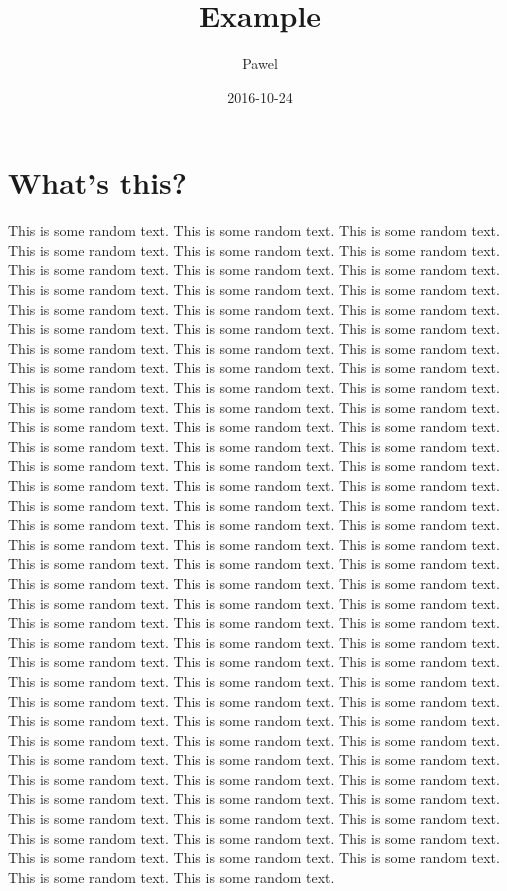 \documentclass[a4paper,35pt]{article}
\begin{document}
\title{Example}
\author{Pawel}
\date{2016-10-24}
\maketitle

\section{What's this?}
This is some random text.
This is some random text.
This is some random text.
This is some random text.
This is some random text.
This is some random text.
This is some random text.
This is some random text.
This is some random text.
This is some random text.
This is some random text.
This is some random text.
This is some random text.
This is some random text.
This is some random text.
This is some random text.
This is some random text.
This is some random text.
This is some random text.
This is some random text.
This is some random text.
This is some random text.
This is some random text.
This is some random text.
This is some random text.
This is some random text.
This is some random text.
This is some random text.
This is some random text.
This is some random text.
This is some random text.
This is some random text.
This is some random text.
This is some random text.
This is some random text.
This is some random text.
This is some random text.
This is some random text.
This is some random text.
This is some random text.
This is some random text.
This is some random text.
This is some random text.
This is some random text.
This is some random text.
This is some random text.
This is some random text.
This is some random text.
This is some random text.
This is some random text.
This is some random text.
This is some random text.
This is some random text.
This is some random text.
This is some random text.
This is some random text.
This is some random text.
This is some random text.
This is some random text.
This is some random text.
This is some random text.
This is some random text.
This is some random text.
This is some random text.
This is some random text.
This is some random text.
This is some random text.
This is some random text.
This is some random text.
This is some random text.
This is some random text.
This is some random text.
This is some random text.
This is some random text.
This is some random text.
This is some random text.
This is some random text.
This is some random text.
This is some random text.
This is some random text.
This is some random text.
This is some random text.
This is some random text.
This is some random text.
This is some random text.
This is some random text.
This is some random text.
This is some random text.
This is some random text.
This is some random text.
This is some random text.
This is some random text.
This is some random text.
This is some random text.
This is some random text.
This is some random text.
This is some random text.
This is some random text.
This is some random text.
This is some random text.
This is some random text.
\end{document}
